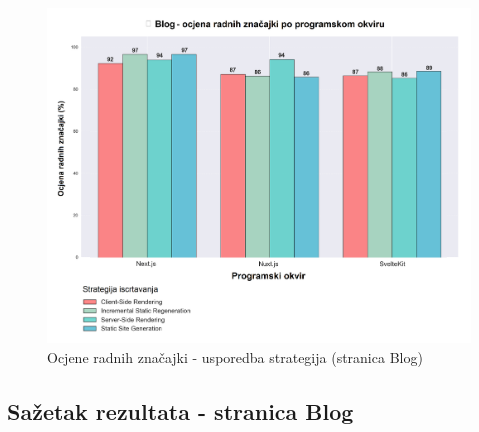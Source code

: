 \begin{figure}[H]
    \centering
    \includegraphics[width=\textwidth]{slike/rezultati/blog/blog_strategy_comparison.png}
    \caption{Ocjene radnih značajki - usporedba strategija (stranica Blog)}
    \label{fig:testiranje-blog-usporedba-strategija}
\end{figure}

\newpage

\subsection{Sažetak rezultata - stranica Blog}


